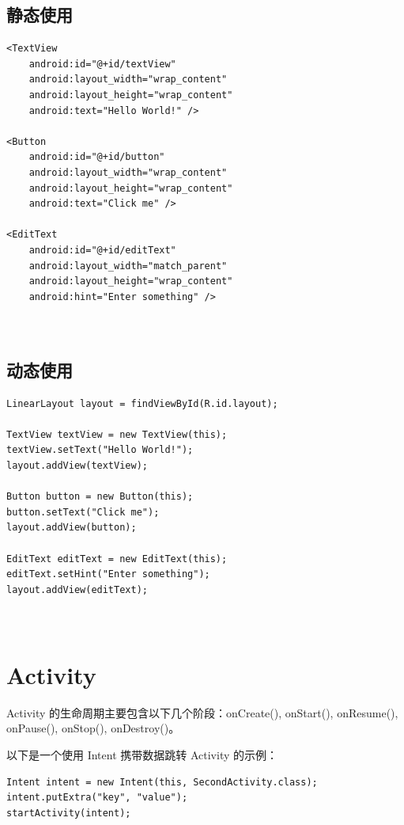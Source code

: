 \documentclass[12pt, a4paper, oneside]{ctexbook}
\numberwithin{figure}{section}
\begin{document}
\subsection{静态使用}
\begin{verbatim}
<TextView
    android:id="@+id/textView"
    android:layout_width="wrap_content"
    android:layout_height="wrap_content"
    android:text="Hello World!" />

<Button
    android:id="@+id/button"
    android:layout_width="wrap_content"
    android:layout_height="wrap_content"
    android:text="Click me" />

<EditText
    android:id="@+id/editText"
    android:layout_width="match_parent"
    android:layout_height="wrap_content"
    android:hint="Enter something" />



\end{verbatim}

\subsection{动态使用}
\begin{verbatim}
LinearLayout layout = findViewById(R.id.layout);

TextView textView = new TextView(this);
textView.setText("Hello World!");
layout.addView(textView);

Button button = new Button(this);
button.setText("Click me");
layout.addView(button);

EditText editText = new EditText(this);
editText.setHint("Enter something");
layout.addView(editText);



\end{verbatim}

\section{Activity}
Activity 的生命周期主要包含以下几个阶段：onCreate(), onStart(), onResume(), onPause(), onStop(), onDestroy()。

以下是一个使用 Intent 携带数据跳转 Activity 的示例：

\begin{verbatim}
Intent intent = new Intent(this, SecondActivity.class);
intent.putExtra("key", "value");
startActivity(intent);

\end{verbatim}
\end{document}
